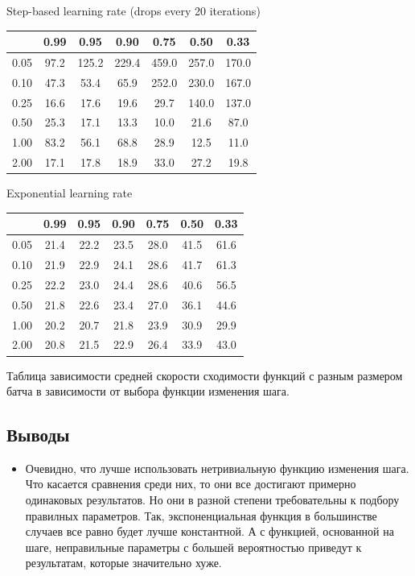 \documentclass[a4paper,14pt,oneside,openany]{memoir}
\begin{document}
	Step-based learning rate (drops every 20 iterations) 
	
	\begin{tabular}{|c|c|c|c|c|c|c|}
	\hline 
	 &0.99 &0.95 &0.90 &0.75 &0.50 &0.33 \\
	 \hline 
	0.05 &97.2 &125.2 &229.4 &459.0 &257.0 &170.0 \\
	 \hline 
	0.10 &47.3 &53.4 &65.9 &252.0 &230.0 &167.0 \\
	 \hline 
	0.25 &16.6 &17.6 &19.6 &29.7 &140.0 &137.0 \\
	 \hline 
	0.50 &25.3 &17.1 &13.3 &10.0 &21.6 &87.0 \\
	 \hline 
	1.00 &83.2 &56.1 &68.8 &28.9 &12.5 &11.0 \\
	 \hline 
	2.00 &17.1 &17.8 &18.9 &33.0 &27.2 &19.8 \\
	 \hline 
	
	\end{tabular}
	
	Exponential learning rate 
	
	\begin{tabular}{|c|c|c|c|c|c|c|}
	\hline 
	 &0.99 &0.95 &0.90 &0.75 &0.50 &0.33 \\
	 \hline 
	0.05 &21.4 &22.2 &23.5 &28.0 &41.5 &61.6 \\
	 \hline 
	0.10 &21.9 &22.9 &24.1 &28.6 &41.7 &61.3 \\
	 \hline 
	0.25 &22.2 &23.0 &24.4 &28.6 &40.6 &56.5 \\
	 \hline 
	0.50 &21.8 &22.6 &23.4 &27.0 &36.1 &44.6 \\
	 \hline 
	1.00 &20.2 &20.7 &21.8 &23.9 &30.9 &29.9 \\
	 \hline 
	2.00 &20.8 &21.5 &22.9 &26.4 &33.9 &43.0 \\
	 \hline 
	
	\end{tabular}
	
    \begin{table}[ht]\caption{Таблица зависимости средней скорости сходимости функций с разным размером батча в зависимости от выбора функции изменения шага.}
    \end{table}
    

    
    \subsection{Выводы}
    
    \begin{itemize}
    \item Очевидно, что лучше использовать нетривиальную функцию изменения шага. Что касается сравнения среди них, то они все достигают примерно одинаковых результатов. Но они в разной степени требовательны к подбору правилных параметров. Так, экспоненциальная функция в большинстве случаев все равно будет лучше константной. А с функцией, основанной на шаге, неправильные параметры с большей вероятностью приведут к результатам, которые значительно хуже.
    \end{itemize}
    
\end{document}
